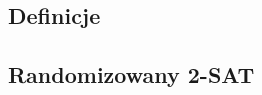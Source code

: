 {
\subsection{Definicje}

    

\makeatletter
{}
\makeatother
\graphicspath{{../probabil}}

\let\realsection\section
\let\realsubsection\subsection
\let\section\subsection
\let\subsection\subsubsection
\let\subsubsection\paragraph


\realsubsection{Randomizowany 2-SAT}
\label{2-sat-alg}

}


